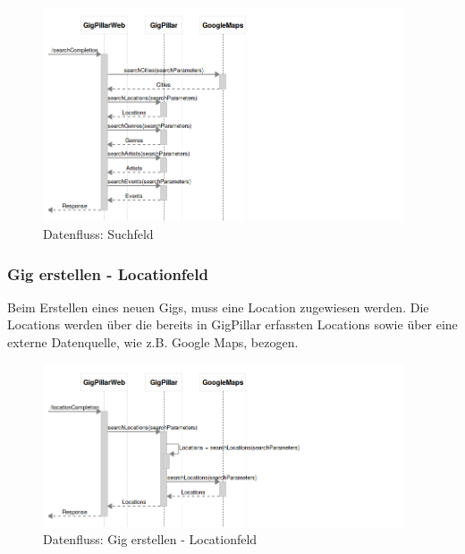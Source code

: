 %

\begin{figure}[!htb]
  \centering
  \includegraphics[width=0.95\textwidth]{konzept/datenfluss-suchfeld.png}
  \caption{Datenfluss: Suchfeld}
\end{figure}

\clearpage
\subsubsection{Gig erstellen - Locationfeld}\label{datenfluss-gig-erstellen-locationfeld}

Beim Erstellen eines neuen Gigs, muss eine Location zugewiesen werden. Die
Locations werden über die bereits in GigPillar erfassten Locations sowie über
eine externe Datenquelle, wie z.B. Google Maps, bezogen.

%

\begin{figure}[!htb]
  \centering
  \includegraphics[width=0.95\textwidth]{konzept/datenfluss-locationfeld.png}
  \caption{Datenfluss: Gig erstellen - Locationfeld}
\end{figure}

